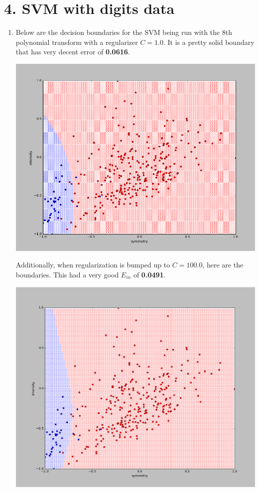 \documentclass[12pt]{article}
\begin{document}
\section*{4. SVM with digits data}
\begin{enumerate}[label=(\alph*)]
	\item Below are the decision boundaries for the SVM being run with the 8th polynomial transform with a regularizer $C = 1.0$. It is a pretty solid boundary that has very decent error of \textbf{0.0616}.
	
	\includegraphics[scale=0.6]{4a1.png}
	
	Additionally, when regularization is bumped up to $C = 100.0$, here are the boundaries. This had a very good $E_{in}$ of \textbf{0.0491}.
	
	\includegraphics[scale=0.6]{4a2.png}
	

\end{enumerate}
\end{document}
